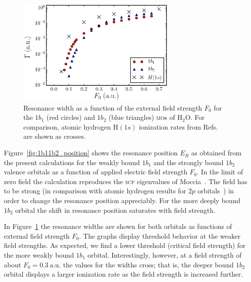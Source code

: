 \begin{figure}
  \centering
  \includegraphics[width=0.7\textwidth]{figures/ch_H2O/1b1_1b2/resWidthvsF1b11b2H1s.eps}
  \caption{Resonance width as a function of the external field
    strength $F_{0}$ for the $1b_{1}$ (red circles) and $1b_{2}$ (blue
    triangles) \textsc{mo}s of H$_{2}$O. For comparison, atomic
    hydrogen H$(1s)$ ionization rates from
    Refs.~\cite{Telnov_1989,Kolosov_1987} are shown as crosses.}
  \label{fig:1b11b2_width}
\end{figure}

Figure~\ref{fig:1b11b2_position} shows the resonance position $E_{R}$
as obtained from the present calculations for the weakly bound
$1b_{1}$ and the strongly bound $1b_{2}$ valence orbitals as a
function of applied electric field strength $F_{0}$. In the limit of
zero field the calculation reproduces the \textsc{scf} eigenvalues of
Moccia~\cite{Moccia_1964}. The field has to be strong (in comparison
with atomic hydrogen results for $2p$ orbitals~\cite{Telnov_1989}) in
order to change the resonance position appreciably. For the more
deeply bound $1b_{2}$ orbital the shift in resonance position
saturates with field strength.

In Figure~\ref{fig:1b11b2_width} the resonance widths are shown for
both orbitals as functions of external field strength $F_{0}$. The
graphs display threshold behavior at the weaker field strengths. As
expected, we find a lower threshold (critical field strength) for the
more weakly bound $1b_{1}$ orbital. Interestingly, however, at a field
strength of about $F_{0} = 0.3\ \mathrm{a.u.}$ the values for the
widths cross; that is, the deeper bound $1b_{2}$ orbital displays a
larger ionization rate as the field strength is increased further.

